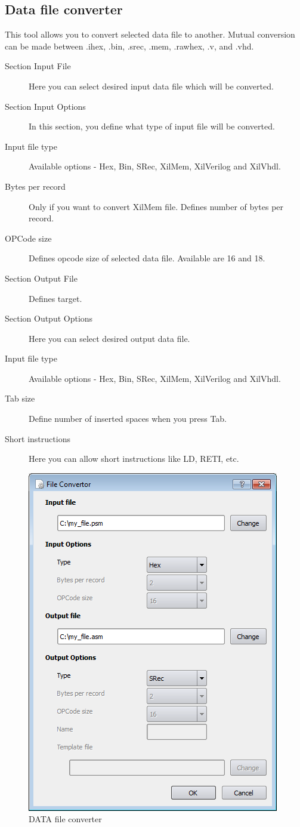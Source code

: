\subsection{Data file converter}
    This tool allows you to convert selected data file to another. Mutual conversion can be made between .ihex, .bin,
    .srec, .mem, .rawhex, .v, and .vhd.
    \begin{description}
        \item[Section Input File] Here you can select desired input data file which will be converted.
        \item[Section Input Options] In this section, you define what type of input file will be converted.
        \item[Input file type] Available options - Hex, Bin, SRec, XilMem, XilVerilog and XilVhdl.
        \item[Bytes per record] Only if you want to convert XilMem file. Defines number of bytes per record.
        \item[OPCode size] Defines opcode size of selected data file. Available are 16 and 18.
        \item[Section Output File] Defines target.
        \item[Section Output Options] Here you can select desired output data file.
        \item[Input file type] Available options - Hex, Bin, SRec, XilMem, XilVerilog and XilVhdl.
        \item[Tab size]  Define number of inserted spaces when you press Tab.
        \item[Short instructions] Here you can allow short instructions like LD, RETI, etc.
    \end{description}

    \begin{figure}[h]
        \centering
        \includegraphics[width=.5\textwidth]{img/DATA_converter.png}
        \caption{DATA file converter}
    \end{figure}

